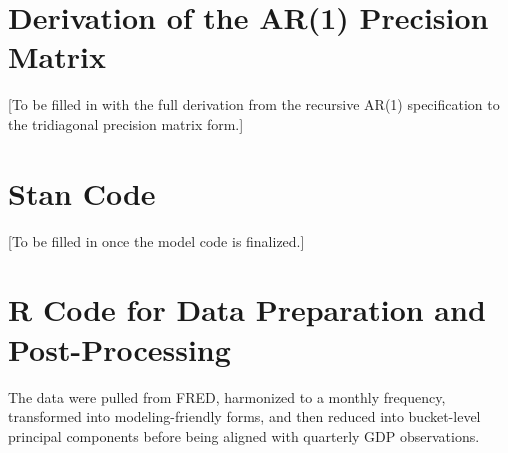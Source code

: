 \documentclass[11pt]{article}
\begin{document}
\appendix

\section{Derivation of the AR(1) Precision Matrix}
[To be filled in with the full derivation from the recursive AR(1) specification to the tridiagonal precision matrix form.]

\section{Stan Code}
[To be filled in once the model code is finalized.]

\section{R Code for Data Preparation and Post-Processing}
The data were pulled from FRED, harmonized to a monthly frequency, transformed into modeling-friendly forms, and then reduced into bucket-level principal components before being aligned with quarterly GDP observations.
\end{document}
